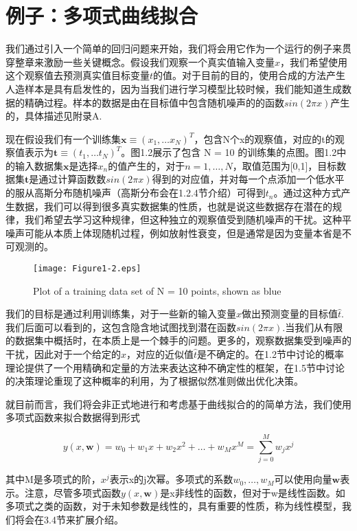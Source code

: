 \section{例子：多项式曲线拟合}
	我们通过引入一个简单的回归问题来开始，我们将会用它作为一个运行的例子来贯穿整章来激励一些关键概念。假设我们观察一个真实值输入变量$x$，我们希望使用这个观察值去预测真实值目标变量$t$的值。对于目前的目的，使用合成的方法产生人造样本是具有启发性的，因为当我们进行学习模型比较时候，我们能知道生成数据的精确过程。样本的数据是由在目标值中包含随机噪声的的函数$sin(2 \pi x)$产生的，具体描述见附录A.

	现在假设我们有一个训练集$\mathbf{x} \equiv (x_1, \dots x_N)^T $，包含N个x的观察值，对应的t的观察值表示为$\mathbf{t} \equiv (t_1, \dots t_N)^T $。图1.2展示了包含 N = 10 的训练集的点图。图1.2中的输入数据集$\mathbf{x}$是选择$x_n$的值产生的，对于$n = 1, \dots ,N$，取值范围为[0,1]，目标数据集$\mathbf{t}$是通过计算函数数$sin(2 \pi x)$得到的对应值，并对每一个点添加一个低水平的服从高斯分布随机噪声（高斯分布会在1.2.4节介绍）可得到$t_n$。通过这种方式产生数据，我们可以得到很多真实数据集的性质，也就是说这些数据存在潜在的规律，我们希望去学习这种规律，但这种独立的观察值受到随机噪声的干扰。这种平噪声可能从本质上体现随机过程，例如放射性衰变，但是通常是因为变量本省是不可观测的。
	
\begin{figure}
	\centering
	\texttt{[image: Figure1-2.eps]}
	\caption{Plot of a training data set of N = 10 points, shown as blue} 
	\label{fig:endb-flow} 
	
\end{figure}
	我们的目标是通过利用训练集，对于一些新的输入变量$\hat{x}$做出预测变量的目标值$\hat{t}$.我们后面可以看到的，这包含隐含地试图找到潜在函数$sin(2 \pi x)$.当我们从有限的数据集中概括时，在本质上是一个棘手的问题。更多的，观察数据集受到噪声的干扰，因此对于一个给定的$\hat{x}$，对应的近似值$\hat{t}$是不确定的。在1.2节中讨论的概率理论提供了一个用精确和定量的方法来表达这种不确定性的框架，在1.5节中讨论的决策理论重现了这种概率的利用，为了根据似然准则做出优化决策。
	
	就目前而言，我们将会非正式地进行和考虑基于曲线拟合的的简单方法，我们使用多项式函数来拟合数据得到形式
	
	\begin{equation}
	y(x,\mathbf{w}) = w_0 + w_1x + w_2x^2 + \dots + w_Mx^M = \sum_{j = 0}^{M}w_jx^j
	\end{equation}
	
	其中M是多项式的阶，$x^j$表示x的j次幂。多项式的系数$w_0, \dots ,w_M$可以使用向量$\mathbf{w}$表示。注意，尽管多项式函数$y(x,\mathbf{w})$是x非线性的函数，但对于w是线性函数。如多项式之类的函数，对于未知参数是线性的，具有重要的性质，称为线性模型，我们将会在3.4节来扩展介绍。
	

